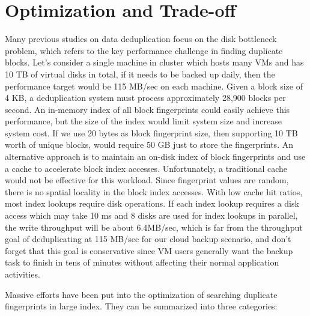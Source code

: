 \section{Optimization and Trade-off}
\label{back:optm}
Many previous studies on data deduplication focus on the disk bottleneck problem,
which refers to the key performance challenge in finding duplicate blocks. 
Let's consider a single machine in cluster which hosts many VMs and has 10 TB of virtual disks in total,
if it needs to be backed up daily, then the performance target would be 115 MB/sec on each machine.
Given a block size of 4 KB, a deduplication system must process approximately 28,900 blocks per second.
An in-memory index of all block fingerprints could easily achieve this performance, but the size of the index would limit system size and increase system cost. 
If we use 20 bytes as block fingerprint size, then supporting 10 TB worth of unique blocks, would require 50 GB just to store the fingerprints.
An alternative approach is to maintain an on-disk index of block fingerprints and use a cache to accelerate block index accesses. Unfortunately, a traditional cache would not be effective for this workload. Since fingerprint values are random, there is no spatial locality in the block index accesses. 
With low cache hit ratios, most index lookups require disk operations. If each index lookup requires a disk access which may take 10 ms and 8 disks are used for index lookups in parallel, the write throughput will be about 6.4MB/sec, which is far from the throughput goal of deduplicating at 115 MB/sec for our cloud backup scenario, and don't forget that this goal
is conservative since VM users generally want the backup task to finish in tens of minutes without affecting their normal
application activities.

Massive efforts have been put into the optimization of searching duplicate
fingerprints in large index. They can be summarized into three categories:

